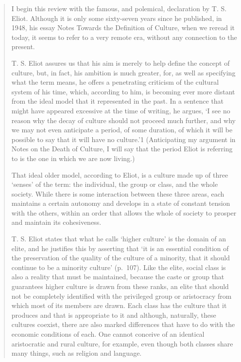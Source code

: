 \documentclass[]{book}
\begin{document}
\begin{quote}
I begin this review with the famous, and polemical, declaration by T. S. Eliot. Although it is only some sixty-seven years since he published, in 1948, his essay Notes Towards the Definition of Culture, when we reread it today, it seems to refer to a very remote era, without any connection to the present.

T. S. Eliot assures us that his aim is merely to help define the concept of culture, but, in fact, his ambition is much greater, for, as well as specifying what the term means, he offers a penetrating criticism of the cultural system of his time, which, according to him, is becoming ever more distant from the ideal model that it represented in the past. In a sentence that might have appeared excessive at the time of writing, he argues, `I see no reason why the decay of culture should not proceed much further, and why we may not even anticipate a period, of some duration, of which it will be possible to say that it will have no culture.'1 (Anticipating my argument in Notes on the Death of Culture, I will say that the period Eliot is referring to is the one in which we are now living.)

That ideal older model, according to Eliot, is a culture made up of three `senses' of the term: the individual, the group or class, and the whole society. While there is some interaction between these three areas, each maintains a certain autonomy and develops in a state of constant tension with the others, within an order that allows the whole of society to prosper and maintain its cohesiveness.

T. S. Eliot states that what he calls `higher culture' is the domain of an elite, and he justifies this by asserting that `it is an essential condition of the preservation of the quality of the culture of a minority, that it should continue to be a minority culture' (p.~107). Like the elite, social class is also a reality that must be maintained, because the caste or group that guarantees higher culture is drawn from these ranks, an elite that should not be completely identified with the privileged group or aristocracy from which most of its members are drawn. Each class has the culture that it produces and that is appropriate to it and although, naturally, these cultures coexist, there are also marked differences that have to do with the economic conditions of each. One cannot conceive of an identical aristocratic and rural culture, for example, even though both classes share many things, such as religion and language.


\end{quote}
\end{document}
